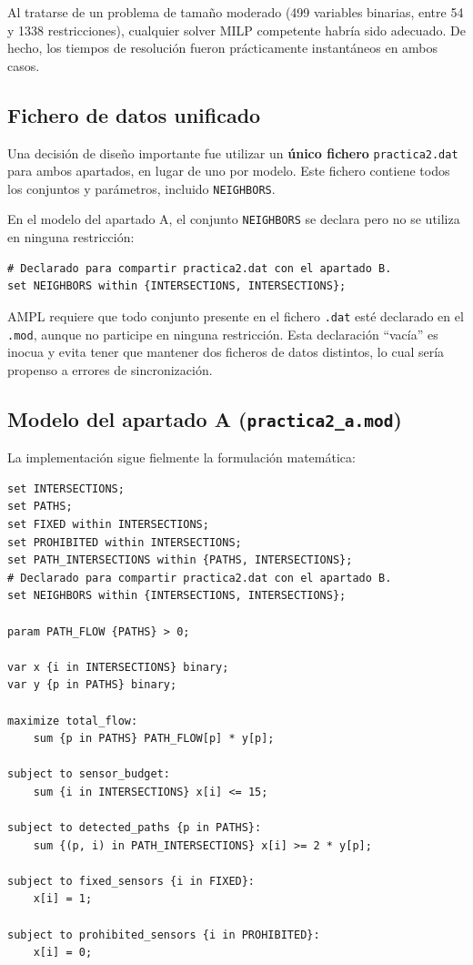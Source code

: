 \documentclass[12pt,a4paper]{article}
\begin{document}
Al tratarse de un problema de tamaño moderado (499 variables binarias, entre 54 y 1338 restricciones), cualquier solver MILP competente habría sido adecuado. De hecho, los tiempos de resolución fueron prácticamente instantáneos en ambos casos.

\subsection{Fichero de datos unificado}

Una decisión de diseño importante fue utilizar un \textbf{único fichero} \texttt{practica2.dat} para ambos apartados, en lugar de uno por modelo. Este fichero contiene todos los conjuntos y parámetros, incluido \texttt{NEIGHBORS}.

En el modelo del apartado A, el conjunto \texttt{NEIGHBORS} se declara pero no se utiliza en ninguna restricción:

\begin{lstlisting}
# Declarado para compartir practica2.dat con el apartado B.
set NEIGHBORS within {INTERSECTIONS, INTERSECTIONS};
\end{lstlisting}

AMPL requiere que todo conjunto presente en el fichero \texttt{.dat} esté declarado en el \texttt{.mod}, aunque no participe en ninguna restricción. Esta declaración ``vacía'' es inocua y evita tener que mantener dos ficheros de datos distintos, lo cual sería propenso a errores de sincronización.

\subsection{Modelo del apartado A (\texttt{practica2\_a.mod})}

La implementación sigue fielmente la formulación matemática:

\begin{lstlisting}[caption={Modelo AMPL completo del apartado A}]
set INTERSECTIONS;
set PATHS;
set FIXED within INTERSECTIONS;
set PROHIBITED within INTERSECTIONS;
set PATH_INTERSECTIONS within {PATHS, INTERSECTIONS};
# Declarado para compartir practica2.dat con el apartado B.
set NEIGHBORS within {INTERSECTIONS, INTERSECTIONS};

param PATH_FLOW {PATHS} > 0;

var x {i in INTERSECTIONS} binary;
var y {p in PATHS} binary;

maximize total_flow:
    sum {p in PATHS} PATH_FLOW[p] * y[p];

subject to sensor_budget:
    sum {i in INTERSECTIONS} x[i] <= 15;

subject to detected_paths {p in PATHS}:
    sum {(p, i) in PATH_INTERSECTIONS} x[i] >= 2 * y[p];

subject to fixed_sensors {i in FIXED}:
    x[i] = 1;

subject to prohibited_sensors {i in PROHIBITED}:
    x[i] = 0;
\end{lstlisting}
\end{document}
